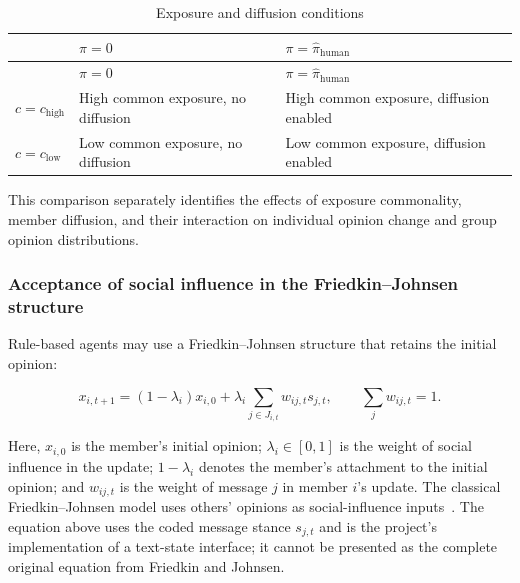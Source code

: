 \documentclass[11pt,a4paper]{article}
\renewcommand{\arraystretch}{1.2}
\begin{document}
\begin{center}
\small
\renewcommand{\arraystretch}{1.18}
\begin{longtable}{@{}>{\RaggedRight\arraybackslash}p{}>{\RaggedRight\arraybackslash}p{}>{\RaggedRight\arraybackslash}p{}@{}}
\caption{Exposure and diffusion conditions}\label{tab:exposure_diffusion}\\
\toprule
\textbf{} & \textbf{$\pi=0$} & \textbf{$\pi=\hat\pi_{\text{human}}$} \\
\midrule
\endfirsthead
\toprule
\textbf{} & \textbf{$\pi=0$} & \textbf{$\pi=\hat\pi_{\text{human}}$} \\
\midrule
\endhead
$c=c_{\text{high}}$ & High common exposure, no diffusion & High common exposure, diffusion enabled \\
$c=c_{\text{low}}$ & Low common exposure, no diffusion & Low common exposure, diffusion enabled \\
\bottomrule
\end{longtable}
\end{center}

This comparison separately identifies the effects of exposure commonality, member diffusion, and their interaction on individual opinion change and group opinion distributions.

\subsubsection{Acceptance of social influence in the Friedkin--Johnsen structure}

Rule-based agents may use a Friedkin--Johnsen structure that retains the initial opinion:

\begin{equation*}
x_{i,t+1}
=
(1-\lambda_i)x_{i,0}
+
\lambda_i
\sum_{j\in J_{i,t}}
w_{ij,t}s_{j,t},
\qquad
\sum_jw_{ij,t}=1.
\end{equation*}

Here, $x_{i,0}$ is the member's initial opinion; $\lambda_i\in[0,1]$ is the weight of social influence in the update; $1-\lambda_i$ denotes the member's attachment to the initial opinion; and $w_{ij,t}$ is the weight of message $j$ in member $i$'s update. The classical Friedkin--Johnsen model uses others' opinions as social-influence inputs~\citep{friedkin1990}. The equation above uses the coded message stance $s_{j,t}$ and is the project's implementation of a text-state interface; it cannot be presented as the complete original equation from Friedkin and Johnsen.
\end{document}
